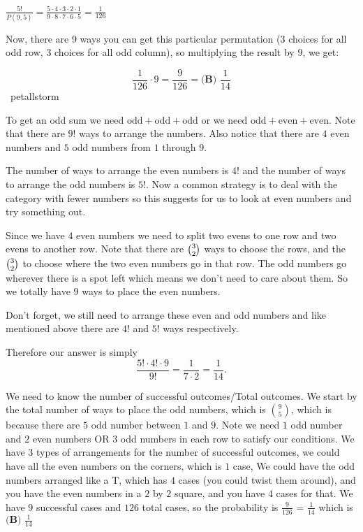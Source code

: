 \documentclass{article}%
\begin{document}
\begin{enumerate}
$\frac{5!}{P(9,5)} = \frac{5 \cdot 4\cdot 3 \cdot 2 \cdot 1}{9 \cdot 8\cdot 7 \cdot 6 \cdot 5} = \frac{1}{126}$

Now, there are 9 ways you can get this particular permutation (3 choices for all odd row, 3 choices for all odd column), so multiplying the result by $9$, we get:

\[\frac{1}{126} \cdot 9 = \frac{9}{126} = \boxed{\textbf{(B) }\frac{1}{14}}\]
~petallstorm

To get an odd sum we need $\text{odd} + \text{odd} + \text{odd}$ or we need $\text{odd} + \text{even} + \text{even}$. Note that there are $9!$ ways to arrange the numbers. Also notice that there are $4$ even numbers and $5$ odd numbers from $1$ through $9$. 

The number of ways to arrange the even numbers is $4!$ and the number of ways to arrange the odd numbers is $5!$. Now a common strategy is to deal with the category with fewer numbers so this suggests for us to look at even numbers and try something out. 

Since we have $4$ even numbers we need to split two evens to one row and two evens to another row. Note that there are $\tbinom{3}{2}$ ways to choose the rows, and the $\tbinom{3}{2}$ to choose where the two even numbers go in that row. The odd numbers go wherever there is a spot left which means we don't need to care about them. So we totally have $9$ ways to place the even numbers. 

Don't forget, we still need to arrange these even and odd numbers and like mentioned above there are $4!$ and $5!$ ways respectively.  

Therefore our answer is simply \[\frac{5! \cdot 4! \cdot 9}{9!} = \frac{1}{7\cdot 2} = \boxed{\frac{1}{14}}.\]

We need to know the number of successful outcomes/Total outcomes. We start by the total number of ways to place the odd numbers, which is $\binom{9}{5}$, which is because there are $5$ odd number between $1$ and $9$. Note we need $1$ odd number and $2$ even numbers OR $3$ odd numbers in each row to satisfy our conditions. We have $3$ types of arrangements for the number of successful outcomes, we could have all the even numbers on the corners, which is $1$ case, We could have the odd numbers arranged like a T, which has $4$ cases (you could twist them around), and you have the even numbers in a $2$ by $2$ square, and you have $4$ cases for that. We have $9$ successful cases and $126$ total cases, so the probability is $\frac{9}{126}$ = $\frac{1}{14}$ which is $\boxed{\textbf{(B) }\frac{1}{14}}$


\end{enumerate}
\end{document}
